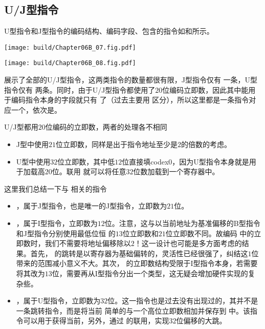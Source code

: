 \subsection{U/J型指令}

U型指令和J型指令的编码结构、编码字段、包含的指令如和所示。
\begin{Figure}[J型指令的编码]
    \texttt{[image: build/Chapter06B\_07.fig.pdf]}
\end{Figure}

\begin{Figure}[U型指令的编码]
    \texttt{[image: build/Chapter06B\_08.fig.pdf]}
\end{Figure}

展示了全部的U/J型指令，这两类指令的数量都很有限，J型指令仅有 一条，U型指令仅有 两条。同时，由于U/J型指令都使用了$20$位编码立即数，因此其中能用于编码指令本身的字段就只有 了（过去主要用 区分），所以这里都是一条指令对应一个，依次是。

U/J型都用$20$位编码的立即数，两者的处理各不相同
\begin{itemize}
    \item J型中使用$21$位立即数，同样是出于指令地址至少是$2$的倍数的考虑。
    \item U型中使用$32$位立即数，其中低$12$位直接填codex{0}，因为U型指令本身就是用于加载高$20$位。联用 就可以将任意$32$位数加载到一个寄存器中。
\end{itemize}

这里我们总结一下与 相关的指令
\begin{itemize}
    \item {}，属于J型指令，也是唯一的J型指令，立即数为$21$位。
    \item {}，属于I型指令，立即数为$12$位。注意，这与以当前地址为基准偏移的B型指令和J型指令分别使用最低位恒 的$13$位立即数和$21$位立即数不同。故编码 中的立即数时，我们不需要将地址偏移除以$2$！这一设计也可能是多方面考虑的结果。首先， 的跳转是以寄存器为基础偏转的，灵活性已经很强了，纠结这$1$位带来的范围减小意义不大。其次， 的立即数结构受限于I型指令本身，若需要将其改为$13$位，需要再从I型指令分出一个类型，这无疑会增加硬件实现的复杂些。
    \item {}，属于U型指令，立即数为$32$位。这一指令也是过去没有出现过的，其并不是一条跳转指令，而是将当前 简单的与一个高位立即数相加并保存到 中。该指令可以用于获得当前，另外，通过 的联用，实现$32$位偏移的大跳。
\end{itemize}

